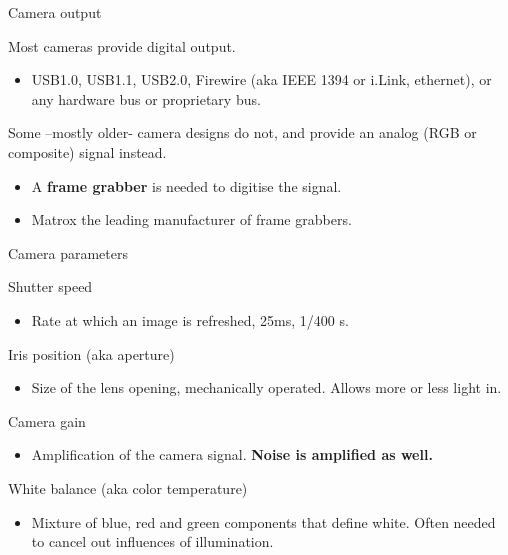 \documentclass[compress]{beamer}
\begin{document}
\begin{frame}{Camera output}

Most cameras provide digital output.

\begin{itemize}

\item
  USB1.0, USB1.1, USB2.0, Firewire (aka IEEE 1394 or i.Link, ethernet),
  or any hardware bus or proprietary bus.
\end{itemize}

Some --mostly older- camera designs do not, and provide an analog (RGB
or composite) signal instead.

\begin{itemize}

\item
  A \textbf{frame grabber} is needed to digitise the signal.
\item
  Matrox the leading manufacturer of frame grabbers.
\end{itemize}

\end{frame}

\begin{frame}{Camera parameters}

Shutter speed

\begin{itemize}

\item
  Rate at which an image is refreshed, \eg 25ms, 1/400 s.
\end{itemize}

Iris position (aka aperture)

\begin{itemize}

\item
  Size of the lens opening, mechanically operated. Allows more or less
  light in.
\end{itemize}

Camera gain

\begin{itemize}

\item
  Amplification of the camera signal. \textbf{Noise is amplified as
  well.}
\end{itemize}

White balance (aka color temperature)

\begin{itemize}

\item
  Mixture of blue, red and green components that define white. Often
  needed to cancel out influences of illumination.
\end{itemize}

\end{frame}
\end{document}

